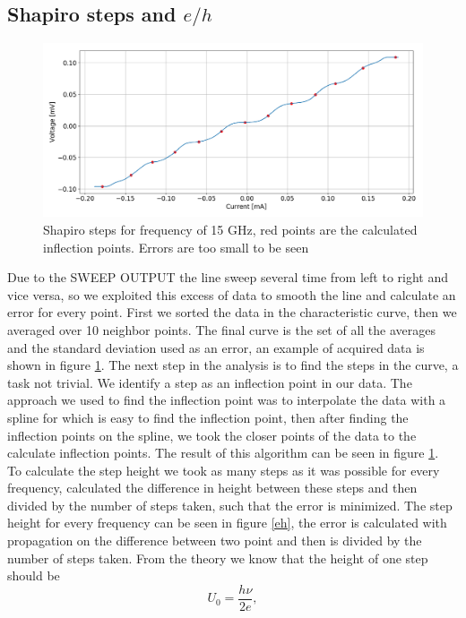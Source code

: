\documentclass[a4paper,10pt]{article}
\begin{document}
\subsection{Shapiro steps and $e/h$}
\begin{figure}[H]
\centering
\includegraphics[width = \textwidth]{shapirosteps}
\caption{Shapiro steps for frequency of 15 GHz, red points are the calculated inflection points. Errors are too small to be seen}\label{shapiro}
\end{figure}
Due to the SWEEP OUTPUT the line sweep several time from left to right and vice versa, so we exploited this excess of data to smooth the line and calculate an error for every point. First we sorted the data in the characteristic curve, then we averaged over 10 neighbor points. The final curve is the set of all the averages and the standard deviation used as an error, an example of acquired data is shown in figure \ref{shapiro}. The next step in the analysis is to find the steps in the curve, a task not trivial. We identify a step as an inflection point in our data. The approach we used to find the inflection point was to interpolate the data with a spline for which is easy to find the inflection point, then after finding the inflection points on the spline, we took the closer points of the data to the calculate inflection points. The result of this algorithm can be seen in figure \ref{shapiro}.\\
To calculate the step height we took as many steps as it was possible for every frequency, calculated the difference in height between these steps and then divided by the number of steps taken, such that the error is minimized. The step height for every frequency can be seen in figure \ref{eh}, the error is calculated with propagation on the difference between two point and then is divided by the number of steps taken. From the theory we know that the height of one step should be
\begin{equation}U_0 = \frac{h\nu}{2e},\end{equation}
\end{document}
